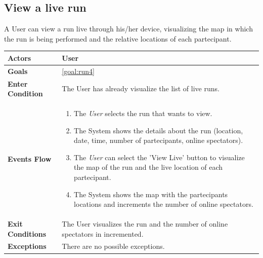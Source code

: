   \subsection{View a live run}
A User can view a run live through his/her device, visualizing the map in which the run is being performed and the relative locations of each partecipant.

\begin{table}[H]
	\centering
    
    \begin{tabular}{|p{3.5cm}|p{10.3cm}|}
    
    \hline
    \textbf{\large{Actors}}  			& \tabitem User 	\\
    				 					
    \hline
    \textbf{\large{Goals}} 				& \ref{goal:run4}\\
    
    \hline
    \textbf{\large{Enter Condition}}	& The User has already visualize the list of live runs.\\
    
    \hline
    \textbf{\large{Events Flow}}		& \begin{enumerate}[leftmargin=0.5cm]
                                          	\item The \emph{User}  selects the run that wants to view.
                                            \item The System shows the details about the run (location, date, time, number of partecipants, online spectators).
                                             \item The \emph{User} can select the 'View Live' button to visualize the map of the run and the live location of each partecipant.
                                            \item The System shows the map with the partecipants locations and increments the number of online spectators.
                                           
                                          \end{enumerate}
    										\\
    \hline
    \textbf{\large{Exit Conditions}}    & The User visualizes the run and the number of online spectators in incremented.  \\
    
    \hline
    \textbf{\large{Exceptions}} 		& There are no possible exceptions. \\
    
    \hline
    
    
    \end{tabular}
	
\end{table}

